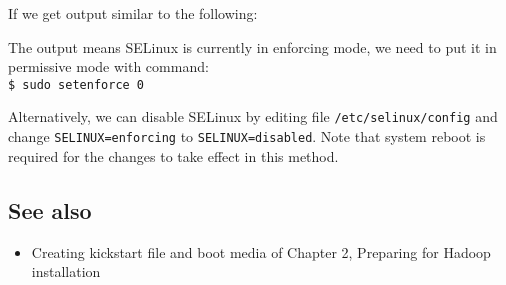 If we get output similar to the following: \\

The output means SELinux is currently in enforcing mode, we need to put it in permissive mode with command: \\
\verb|$ sudo setenforce 0|

Alternatively, we can disable SELinux by editing file \verb|/etc/selinux/config| and change \verb|SELINUX=enforcing| to \verb|SELINUX=disabled|. Note that system reboot is required for the changes to take effect in this method.

\subsection*{See also}
\begin{itemize}
  \item Creating kickstart file and boot media of Chapter 2, Preparing for Hadoop installation
\end{itemize}
